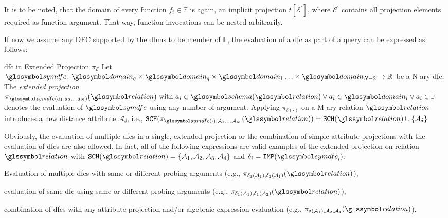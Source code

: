 It is to be noted, that the domain of every function $f_i \in \mathbb{F}$ is again, an implicit projection $t \left[ \mathcal{E}^{'}\right]$, where $\mathcal{E}^{'}$ contains all projection elements required as function argument. That way, function invocations can be nested arbitrarily.

If now we assume any DFC supported by the \acrshort{dbms} to be member of $\mathbb{F}$, the evaluation of a \acrshort{dfc} as part of a query can be expressed as follows:

\begin{definition}[label=definition:spf_rel]{\acrlong{dfc} in Extended Projection $\pi_{\mathcal{E}}$}{}
    Let $\symdfc \colon \domain_q \times \domain_q \times \domain_{1} \ldots \times \domain_{N-2} \to \mathbb{R}$ be a N-ary \acrshort{dfc}. The \emph{extended projection} $\pi_{\symdfc(a_1, a_2, \ldots a_N)}(\relation) \textrm { with } a_i \in \schema(\relation) \vee a_i \in \domain_i \vee a_i \in \mathbb{F}$ denotes the evaluation of $\symdfc$ using any number of argument. Applying $\pi_{\delta(\cdot)}$ on a M-ary relation $\relation$ introduces a new distance attribute $\mathcal{A}_\delta$, i.e., $\mathtt{SCH}(\pi_{\symdfc(\cdot), \mathcal{A}_1, \ldots \mathcal{A}_M}(\relation)) = \mathtt{SCH}(\relation) \cup \{ \mathcal{A}_\delta \}$
\end{definition}

Obviously, the evaluation of multiple \acrshort{dfc}s in a single, extended projection or the combination of simple attribute projections with the evaluation of \acrshort{dfc}s are also allowed. In fact, all of the following expressions are valid examples of the extended projection on relation $\relation$ with $\mathtt{SCH}(\relation) = \{ \mathcal{A}_1, \mathcal{A}_2, \mathcal{A}_3, \mathcal{A}_4 \}$ and $\delta_i = \mathtt{IMP}(\symdfc_i)$: 
\begin{enumerate*}[label=(\roman*)]
    \item Evaluation of multiple \acrshort{dfc}s with same or different probing arguments (e.g., $\pi_{\delta_1(\mathcal{A}_1), \delta_2(\mathcal{A}_1)}(\relation)$), 
    \item evaluation of same \acrshort{dfc} using same or different probing arguments (e.g., $\pi_{\delta_1(\mathcal{A}_1), \delta_1(\mathcal{A}_2)}(\relation)$),
    \item combination of \acrshort{dfc}s with any attribute projection and/or algebraic expression evaluation (e.g., $\pi_{\delta(\mathcal{A}_1), \mathcal{A}_2, \mathcal{A}_4}(\relation)$).
\end{enumerate*}

